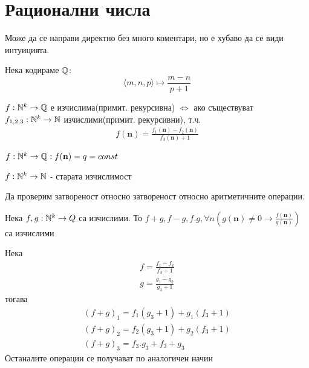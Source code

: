 \section{Рационални числа}
Може да се направи директно без много коментари, но е хубаво да се види интуицията.

Нека кодираме ${\mathbb{Q}}$:
\begin{equation*}
    \langle m, n, p \rangle \mapsto \frac{m - n}{p + 1}
\end{equation*}
\begin{definition}
    $f: {\mathbb{N}}^k \to {\mathbb{Q}}$ е изчислима(примит. рекурсивна) $\iff$ ако съществуват $f_{1,2,3}: {\mathbb{N}}^k \to {\mathbb{N}}$ изчислими(примит. рекурсивни), т.ч.
    \begin{equation*}
        \begin{split}
            f(\textbf{n}) = \frac{f_1(\textbf{n}) - f_2(\textbf{n})}{f_3(\textbf{n}) + 1}
        \end{split}
    \end{equation*}
\end{definition}
\begin{example}
    $f: {\mathbb{N}}^k \to {\mathbb{Q}}: f(\textbf{n}) = q = const$
\end{example}
\begin{example}
    $f: {\mathbb{N}}^k \to {\mathbb{N}}$ - старата изчислимост
\end{example}
\begin{problem}
    Да проверим затвореност относно затвореност относно аритметичните операции.
    
    Нека $f,g :{\mathbb{N}}^k \to Q$ са изчислими. То $f + g, f-g, f.g, \forall n\left(g(\textbf{n}) \neq 0 \rightarrow \frac{f(\textbf{n})}{g(\textbf{n})} \right)$ са изчислими
\end{problem}
\begin{solution}
    Нека
    \begin{equation*}
    \begin{split}
        f = \frac{f_1 - f_2}{f_3 + 1} \\
        g = \frac{g_1 - g_2}{g_3 + 1}
    \end{split}
    \end{equation*}
    тогава
    \begin{equation*}
        \begin{split}
            (f+g)_1 = f_1(g_3 + 1) + g_1(f_3 + 1)\\
            (f+g)_2 = f_2(g_3 + 1) + g_2(f_3 + 1)\\
            (f+g)_3 = f_3.g_3 + f_3 + g_3
        \end{split}
    \end{equation*}
    Останалите операции се получават по аналогичен начин
\end{solution}

